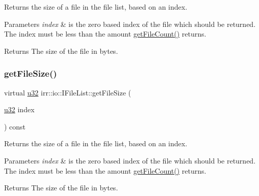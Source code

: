 Returns the size of a file in the file list, based on an index. 


\begin{DoxyParams}{Parameters}
{\em index} & is the zero based index of the file which should be returned. The index must be less than the amount \hyperlink{classirr_1_1io_1_1IFileList_a871861be76e18d58274c4580b1d103b9}{get\+File\+Count()} returns. \\
\hline
\end{DoxyParams}
\begin{DoxyReturn}{Returns}
The size of the file in bytes. 
\end{DoxyReturn}
\mbox{\label{classirr_1_1io_1_1IFileList_a305561d0c5db74ac721da5d26c461b36}} 
\subsubsection{\texorpdfstring{get\+File\+Size()}{getFileSize()}\hspace{0.1cm}{\footnotesize\ttfamily [2/2]}}
{\footnotesize\ttfamily virtual \hyperlink{namespaceirr_a0416a53257075833e7002efd0a18e804}{u32} irr\+::io\+::\+I\+File\+List\+::get\+File\+Size (\begin{DoxyParamCaption}\item[{\hyperlink{namespaceirr_a0416a53257075833e7002efd0a18e804}{u32}}]{index }\end{DoxyParamCaption}) const\hspace{0.3cm}{\ttfamily [pure virtual]}}



Returns the size of a file in the file list, based on an index. 


\begin{DoxyParams}{Parameters}
{\em index} & is the zero based index of the file which should be returned. The index must be less than the amount \hyperlink{classirr_1_1io_1_1IFileList_a871861be76e18d58274c4580b1d103b9}{get\+File\+Count()} returns. \\
\hline
\end{DoxyParams}
\begin{DoxyReturn}{Returns}
The size of the file in bytes. 
\end{DoxyReturn}
\mbox{\label{classirr_1_1io_1_1IFileList_a063c823f58019bda79efabefabe365da}} 
